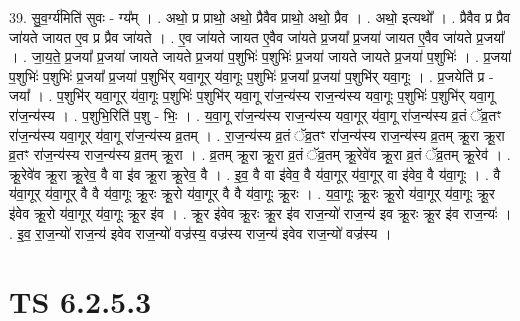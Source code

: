 \documentclass[17pt]{extarticle}
\begin{document}
39. सु॒व॒र्ग्य॑मिति॑ सुवः - ग्य᳚म् । . अथो॒ प्र प्राथो॒ अथो॒ प्रैवैव प्राथो॒ अथो॒ प्रैव । . अथो॒ इत्यथो᳚ । . प्रैवैव प्र प्रैव जा॑यते जायत ए॒व प्र प्रैव जा॑यते । . ए॒व जा॑यते जायत ए॒वैव जा॑यते प्र॒जया᳚ प्र॒जया॑ जायत ए॒वैव जा॑यते प्र॒जया᳚ । . जा॒य॒ते॒ प्र॒जया᳚ प्र॒जया॑ जायते जायते प्र॒जया॑ प॒शुभिः॑ प॒शुभिः॑ प्र॒जया॑ जायते जायते प्र॒जया॑ प॒शुभिः॑ । . प्र॒जया॑ प॒शुभिः॑ प॒शुभिः॑ प्र॒जया᳚ प्र॒जया॑ प॒शुभि॑र् यवा॒गूर् य॑वा॒गूः प॒शुभिः॑ प्र॒जया᳚ प्र॒जया॑ प॒शुभि॑र् यवा॒गूः । . प्र॒जयेति॑ प्र - जया᳚ । . प॒शुभि॑र् यवा॒गूर् य॑वा॒गूः प॒शुभिः॑ प॒शुभि॑र् यवा॒गू रा॑ज॒न्य॑स्य राज॒न्य॑स्य यवा॒गूः प॒शुभिः॑ प॒शुभि॑र् यवा॒गू रा॑ज॒न्य॑स्य । . प॒शुभि॒रिति॑ प॒शु - भिः॒ । . य॒वा॒गू रा॑ज॒न्य॑स्य राज॒न्य॑स्य यवा॒गूर् य॑वा॒गू रा॑ज॒न्य॑स्य व्र॒तं ॅव्र॒तꣳ रा॑ज॒न्य॑स्य यवा॒गूर् य॑वा॒गू रा॑ज॒न्य॑स्य व्र॒तम् । . रा॒ज॒न्य॑स्य व्र॒तं ॅव्र॒तꣳ रा॑ज॒न्य॑स्य राज॒न्य॑स्य व्र॒तम् क्रू॒रा क्रू॒रा व्र॒तꣳ रा॑ज॒न्य॑स्य राज॒न्य॑स्य व्र॒तम् क्रू॒रा । . व्र॒तम् क्रू॒रा क्रू॒रा व्र॒तं ॅव्र॒तम् क्रू॒रेवे॑व क्रू॒रा व्र॒तं ॅव्र॒तम् क्रू॒रेव॑ । . क्रू॒रेवे॑व क्रू॒रा क्रू॒रेव॒ वै वा इ॑व क्रू॒रा क्रू॒रेव॒ वै । . इ॒व॒ वै वा इ॑वेव॒ वै य॑वा॒गूर् य॑वा॒गूर् वा इ॑वेव॒ वै य॑वा॒गूः । . वै य॑वा॒गूर् य॑वा॒गूर् वै वै य॑वा॒गूः क्रू॒रः क्रू॒रो य॑वा॒गूर् वै वै य॑वा॒गूः क्रू॒रः । . य॒वा॒गूः क्रू॒रः क्रू॒रो य॑वा॒गूर् य॑वा॒गूः क्रू॒र इ॑वेव क्रू॒रो य॑वा॒गूर् य॑वा॒गूः क्रू॒र इ॑व । . क्रू॒र इ॑वेव क्रू॒रः क्रू॒र इ॑व राज॒न्यो॑ राज॒न्य॑ इव क्रू॒रः क्रू॒र इ॑व राज॒न्यः॑ । . इ॒व॒ रा॒ज॒न्यो॑ राज॒न्य॑ इवेव राज॒न्यो॑ वज्र॑स्य॒ वज्र॑स्य राज॒न्य॑ इवेव राज॒न्यो॑ वज्र॑स्य । \newline
\pagebreak
{}

\section{ TS 6.2.5.3 }
\end{document}
